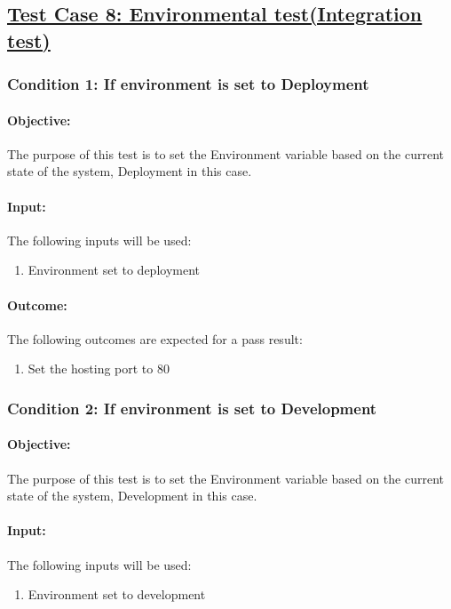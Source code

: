 \documentclass{article}
\begin{document}
\pagebreak

\subsection{\underline{Test Case 8: Environmental test(Integration test)}}\label{test8}
\subsubsection{Condition 1: If environment is set to Deployment }
\paragraph{Objective:} The purpose of this test is to set the Environment variable based on the current state of the system, Deployment in this case.
\paragraph{Input:} The following inputs will be used:
\begin{enumerate}
	\item Environment set to deployment
\end{enumerate}
\paragraph{Outcome:} The following outcomes are expected for a pass result:
\begin{enumerate}
	\item Set the hosting port to 80
\end{enumerate}
\subsubsection{Condition 2: If environment is set to Development }
\paragraph{Objective:} The purpose of this test is to set the Environment variable based on the current state of the system, Development in this case.
\paragraph{Input:} The following inputs will be used:
\begin{enumerate}
	\item Environment set to development
\end{enumerate}
\end{document}

